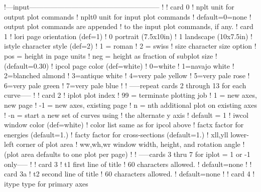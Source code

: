 \small
\begin{ccode}

   !---input--------------------------------------------------------
   !
   !  card 0
   !     nplt          unit for output plot commands
   !     nplt0         unit for input plot commands
   !                     default=0=none
   !                     output plot commands are appended
   !                     to the input plot commands, if any.
   !  card 1
   !     lori          page orientation (def=1)
   !                    0  portrait (7.5x10in)
   !                    1  landscape (10x7.5in)
   !     istyle        character style (def=2)
   !                     1 = roman
   !                     2 = swiss
   !     size          character size option
   !                     pos = height in page units
   !                     neg = height as fraction of subplot size
   !                     (default=0.30)
   !     ipcol         page color (def=white)
   !                    0=white
   !                    1=navajo white
   !                    2=blanched almond
   !                    3=antique white
   !                    4=very pale yellow
   !                    5=very pale rose
   !                    6=very pale green
   !                    7=very pale blue
   !
   ! -----repeat cards 2 through 13 for each curve-----
   !
   !  card 2
   !     iplot         plot index
   !                     99 = terminate plotting job
   !                      1 = new axes, new page
   !                     -1 = new axes, existing page
   !                      n = nth additional plot on existing axes
   !                     -n = start a new set of curves using
   !                          the alternate y axis
   !                     default = 1
   !     iwcol         window color (def=white)
   !                    color list same as for ipcol above
   !     factx         factor for energies (default=1.)
   !     facty         factor for cross-sections (default=1.)
   !     xll,yll       lower-left corner of plot area
   !     ww,wh,wr      window width, height, and rotation angle
   !                   (plot area defaults to one plot per page)
   !
   ! -----cards 3 thru 7 for iplot = 1 or -1 only-----
   !
   !  card 3
   !     t1            first line of title
   !                   60 characters allowed.
   !                   default=none
   !
   !  card 3a
   !     t2            second line of title
   !                   60 characters allowed.
   !                   default=none
   !
   !  card 4
   !     itype         type for primary axes

\end{ccode}
